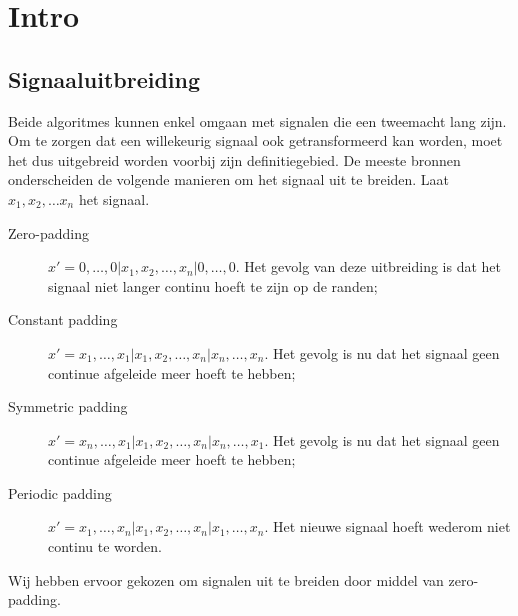 \chapter{Intro}

\section{Signaaluitbreiding}
\label{signaal}
Beide algoritmes kunnen enkel omgaan met signalen die een tweemacht lang zijn. Om te zorgen dat een willekeurig signaal ook getransformeerd kan worden, moet het dus uitgebreid worden voorbij zijn definitiegebied. De meeste bronnen onderscheiden de volgende manieren om het signaal uit te breiden. Laat $x_1, x_2, \ldots x_n$ het signaal.
\begin{description}
\item[Zero-padding] $x' = 0, \ldots, 0| x_1, x_2, \ldots, x_n| 0, \ldots, 0$. Het gevolg van deze uitbreiding is dat het signaal niet langer continu hoeft te zijn op de randen;
\item[Constant padding] $x' = x_1, \ldots, x_1| x_1, x_2, \ldots, x_n| x_n, \ldots, x_n$. Het gevolg is nu dat het signaal geen continue afgeleide meer hoeft te hebben;
\item[Symmetric padding] $x' = x_n, \ldots, x_1| x_1, x_2, \ldots, x_n| x_n, \ldots, x_1$. Het gevolg is nu dat het signaal geen continue afgeleide meer hoeft te hebben;
\item[Periodic padding] $x' = x_1, \ldots, x_n| x_1, x_2, \ldots, x_n| x_1, \ldots, x_n$. Het nieuwe signaal hoeft wederom niet continu te worden.
\end{description}
Wij hebben ervoor gekozen om signalen uit te breiden door middel van zero-padding.

